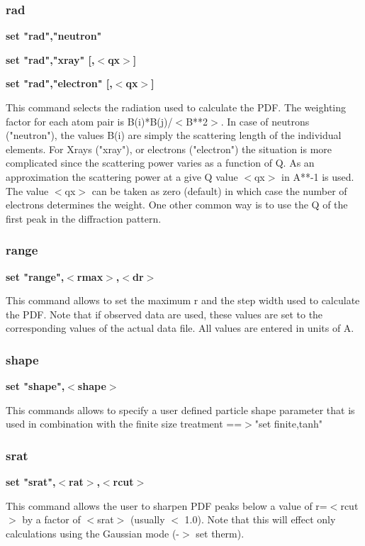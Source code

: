 \subsubsection{rad}
{\bf set "rad","neutron" \par }
{\bf set "rad","xray" [,$ <$qx$> $] \par }
{\bf set "rad","electron" [,$ <$qx$> $] \par }
\par
\vspace{3pt}
This command selects the radiation used to calculate the PDF. 
The weighting factor for each atom pair is B(i)*B(j)/$ <$B**2$> $. 
In case of neutrons ("neutron"), the values B(i) are simply 
the scattering length of the individual elements. For Xrays 
("xray"), or electrons ("electron") the situation is more 
complicated since the scattering 
power varies as a function of Q. As an approximation the 
scattering power at a give Q value $ <$qx$> $ in A**-1 is used. The 
value $ <$qx$> $ can be taken as zero (default) in which case the 
number of electrons determines the weight. One other common 
way is to use the Q of the first peak in the diffraction pattern. 
\subsubsection{range}
{\bf set "range",$ <$rmax$> $,$ <$dr$> $ \par }
\par
\vspace{3pt}
This command allows to set the maximum r and the step width used 
to calculate the PDF. Note that if observed data are used, these 
values are set to the corresponding values of the actual data file. 
All values are entered in units of A. 
\subsubsection{shape}
{\bf set "shape",$ <$shape$> $ \par }
\par
\vspace{3pt}
This commands allows to specify a user defined particle 
shape parameter that is used in combination with the finite size 
treatment ==$> $"set finite,tanh" 
\subsubsection{srat}
{\bf set "srat",$ <$rat$> $,$ <$rcut$> $ \par }
\par
\vspace{3pt}
This command allows the user to sharpen PDF peaks below a value 
of r=$ <$rcut$> $ by a factor of $ <$srat$> $ (usually $ <$ 1.0). Note that this 
will effect only calculations using the Gaussian mode (-$> $ set therm). 
